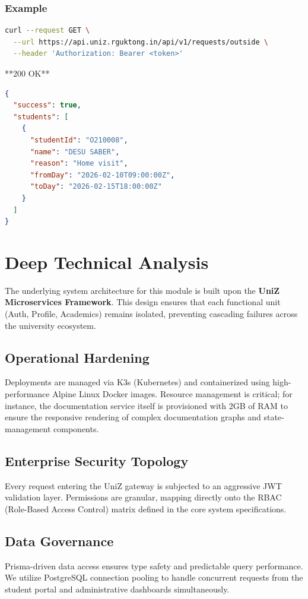 \subsubsection{Example}

\begin{lstlisting}[language=bash]
curl --request GET \
  --url https://api.uniz.rguktong.in/api/v1/requests/outside \
  --header 'Authorization: Bearer <token>'

\end{lstlisting}

**200 OK**

\begin{lstlisting}[language=json]
{
  "success": true,
  "students": [
    {
      "studentId": "O210008",
      "name": "DESU SABER",
      "reason": "Home visit",
      "fromDay": "2026-02-10T09:00:00Z",
      "toDay": "2026-02-15T18:00:00Z"
    }
  ]
}

\end{lstlisting}


\section{Deep Technical Analysis}
The underlying system architecture for this module is built upon the \textbf{UniZ Microservices Framework}. 
This design ensures that each functional unit (Auth, Profile, Academics) remains isolated, preventing cascading failures across the university ecosystem.

\subsection{Operational Hardening}
Deployments are managed via K3s (Kubernetes) and containerized using high-performance Alpine Linux Docker images. 
Resource management is critical; for instance, the documentation service itself is provisioned with 2GB of RAM to ensure the responsive rendering of complex documentation graphs and state-management components.

\subsection{Enterprise Security Topology}
Every request entering the UniZ gateway is subjected to an aggressive JWT validation layer. 
Permissions are granular, mapping directly onto the RBAC (Role-Based Access Control) matrix defined in the core system specifications.

\subsection{Data Governance}
Prisma-driven data access ensures type safety and predictable query performance. 
We utilize PostgreSQL connection pooling to handle concurrent requests from the student portal and administrative dashboards simultaneously.
